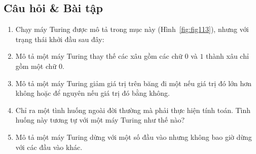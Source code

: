 \subsection*{Câu hỏi \& Bài tập}
\begin{enumerate}
\item Chạy máy Turing được mô tả trong mục này (Hình~\ref{fig:fig113}), nhưng với trạng
  thái khởi đầu sau đây:
\begin{center}
\end{center}

\item Mô tả một máy Turing thay thế các xâu gồm các chữ $0$ và $1$ thành xâu chỉ gồm một
  chữ $0$.

\item Mô tả một máy Turing giảm giá trị trên băng đi một nếu giá trị đó lớn hơn không hoặc
  để nguyên nếu giá trị đó bằng không.

\item Chỉ ra một tình huống ngoài đời thường mà phải thực hiện tính toán. Tình huống này
  tương tự với một máy Turing như thế nào?

\item Mô tả một máy Turing dừng với một số đầu vào nhưng không bao giờ dừng với các đầu
  vào khác.
\end{enumerate}



